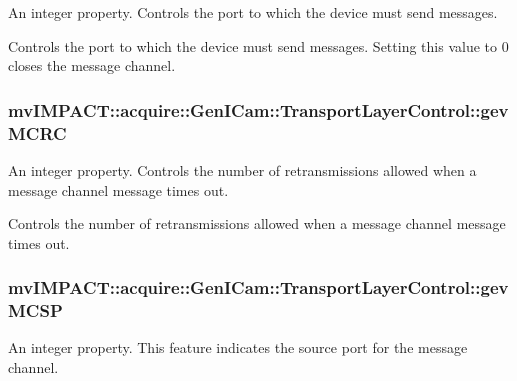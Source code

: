 An integer property. Controls the port to which the device must send messages. 

Controls the port to which the device must send messages. Setting this value to 0 closes the message channel. \hypertarget{classmv_i_m_p_a_c_t_1_1acquire_1_1_gen_i_cam_1_1_transport_layer_control_aae23d62f536f69f299d6d366fd39f27c}{
\subsubsection[{gev\+M\+C\+R\+C}]{ mv\+I\+M\+P\+A\+C\+T\+::acquire\+::\+Gen\+I\+Cam\+::\+Transport\+Layer\+Control\+::gev\+M\+C\+R\+C}}\label{classmv_i_m_p_a_c_t_1_1acquire_1_1_gen_i_cam_1_1_transport_layer_control_aae23d62f536f69f299d6d366fd39f27c}


An integer property. Controls the number of retransmissions allowed when a message channel message times out. 

Controls the number of retransmissions allowed when a message channel message times out. \hypertarget{classmv_i_m_p_a_c_t_1_1acquire_1_1_gen_i_cam_1_1_transport_layer_control_a11ea36e84353e6a473cfab3e0b81d793}{
\subsubsection[{gev\+M\+C\+S\+P}]{ mv\+I\+M\+P\+A\+C\+T\+::acquire\+::\+Gen\+I\+Cam\+::\+Transport\+Layer\+Control\+::gev\+M\+C\+S\+P}}\label{classmv_i_m_p_a_c_t_1_1acquire_1_1_gen_i_cam_1_1_transport_layer_control_a11ea36e84353e6a473cfab3e0b81d793}


An integer property. This feature indicates the source port for the message channel. 

